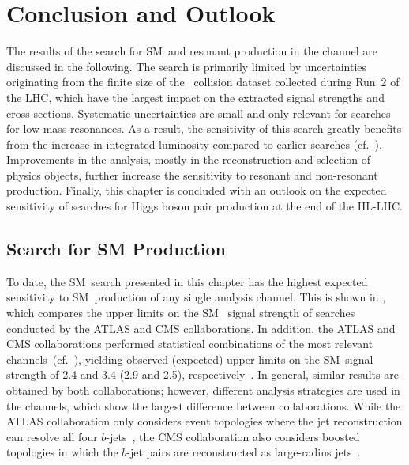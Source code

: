 \section{Conclusion and Outlook}%
\label{sec:result_discussion}

The results of the search for SM~\HH and resonant \HH production in the
\bbtautau channel are discussed in the following. The search is primarily
limited by uncertainties originating from the finite size of the \pp~collision
dataset collected during Run~2 of the LHC, which have the largest impact on the
extracted signal strengths and cross sections. Systematic uncertainties are
small and only relevant for searches for low-mass resonances. As a result, the
sensitivity of this search greatly benefits from the increase in integrated
luminosity compared to earlier searches
(cf.~). Improvements in the analysis, mostly in
the reconstruction and selection of physics objects, further increase the
sensitivity to resonant and non-resonant \HH production. Finally, this chapter
is concluded with an outlook on the expected sensitivity of searches for Higgs
boson pair production at the end of the HL-LHC.

\subsection{Search for SM \HH Production}

To date, the SM~\HH search presented in this chapter has the highest expected
sensitivity to SM~\HH production of any single analysis channel. This is shown
in , which compares the upper limits on the SM~\HH
signal strength of searches conducted by the ATLAS and CMS collaborations. In
addition, the ATLAS and CMS collaborations performed statistical combinations of
the most relevant channels~(cf.~), yielding observed
(expected) upper limits on the SM~\HH signal strength of 2.4 and 3.4 (2.9 and
2.5), respectively~\cite{HDBS-2022-03,CMS-HIG-22-001}.
In general, similar results are obtained by both collaborations; however,
different analysis strategies are used in the \bbbb channels, which show the
largest difference between collaborations. While the ATLAS collaboration only
considers event topologies where the jet reconstruction can resolve all four
$b$-jets~\cite{ATLAS-CONF-2022-035}, the CMS collaboration also considers
boosted topologies in which the $b$-jet pairs are reconstructed as large-radius
jets~\cite{CMS-HIG-20-005,CMS-B2G-22-003}.

